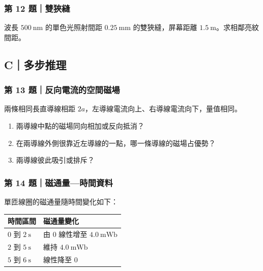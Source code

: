 \documentclass[11pt,a4paper]{article}
\newcounter{none}
\providecommand{\tightlist}{%
  \setlength{\itemsep}{0pt}\setlength{\parskip}{0pt}}
\begin{document}
\subsubsection{第 12 題｜雙狹縫}\label{ux7b2c-12-ux984cux96d9ux72f9ux7e2b}

波長 \(500\ \mathrm{nm}\) 的單色光照射間距 \(0.25\ \mathrm{mm}\) 的雙狹縫，屏幕距離 \(1.5\ \mathrm m\)。求相鄰亮紋間距。

\subsection{C｜多步推理}\label{cux591aux6b65ux63a8ux7406}

\subsubsection{第 13 題｜反向電流的空間磁場}\label{ux7b2c-13-ux984cux53cdux5411ux96fbux6d41ux7684ux7a7aux9593ux78c1ux5834}

兩條相同長直導線相距 \(2a\)，左導線電流向上、右導線電流向下，量值相同。

\begin{enumerate}
\def\labelenumi{\arabic{enumi}.}
\tightlist
\item
  兩導線中點的磁場同向相加或反向抵消？
\item
  在兩導線外側很靠近左導線的一點，哪一條導線的磁場占優勢？
\item
  兩導線彼此吸引或排斥？
\end{enumerate}

\subsubsection{第 14 題｜磁通量---時間資料}\label{ux7b2c-14-ux984cux78c1ux901aux91cfux6642ux9593ux8cc7ux6599}

單匝線圈的磁通量隨時間變化如下：

{\def\LTcaptype{none} %
\begin{longtable}[]{@{}ll@{}}
\toprule\noalign{}
時間區間 & 磁通量變化 \\
\midrule\noalign{}
\endhead
\bottomrule\noalign{}
\endlastfoot
\(0\) 到 \(2\ \mathrm s\) & 由 \(0\) 線性增至 \(4.0\ \mathrm{mWb}\) \\
\(2\) 到 \(5\ \mathrm s\) & 維持 \(4.0\ \mathrm{mWb}\) \\
\(5\) 到 \(6\ \mathrm s\) & 線性降至 \(0\) \\
\end{longtable}
}
\end{document}
